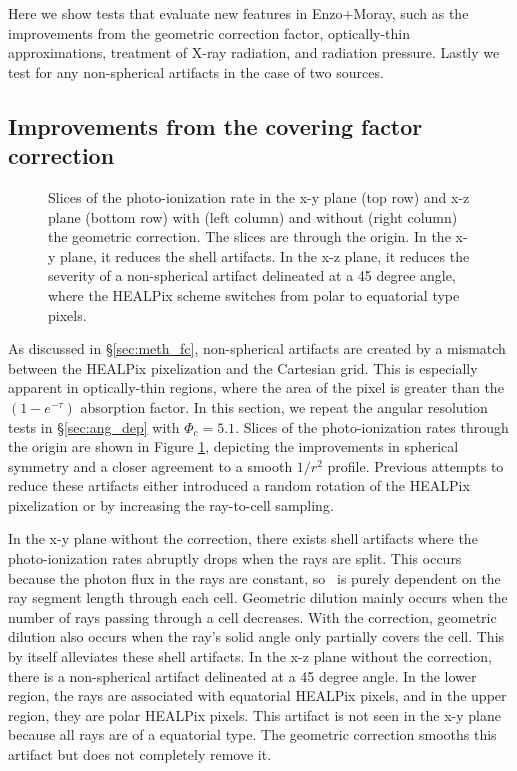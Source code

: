 \documentclass[useAMS,usenatbib,a4paper]{mn2e}
\begin{document}
Here we show tests that evaluate new features in Enzo+Moray, such as
the improvements from the geometric correction factor, optically-thin
approximations, treatment of X-ray radiation, and radiation pressure.
Lastly we test for any non-spherical artifacts in the case of two
sources.

\subsection{Improvements from the covering factor correction}
\label{sec:test_fc}

\begin{figure}
  \caption{\label{fig:fc_slices} Slices of the photo-ionization rate
    in the x-y plane (top row) and x-z plane (bottom row) with (left
    column) and without (right column) the geometric correction.  The
    slices are through the origin.  In the x-y plane, it reduces the
    shell artifacts.  In the x-z plane, it reduces the severity of a
    non-spherical artifact delineated at a 45 degree angle, where the
    HEALPix scheme switches from polar to equatorial type pixels.}
\end{figure}

As discussed in \S\ref{sec:meth_fc}, non-spherical artifacts are
created by a mismatch between the HEALPix pixelization and the
Cartesian grid.  This is especially apparent in optically-thin
regions, where the area of the pixel is greater than the
$(1-e^{-\tau})$ absorption factor.  In this section, we repeat the
angular resolution tests in \S\ref{sec:ang_dep} with $\Phi_c = 5.1$.
Slices of the photo-ionization rates through the origin are shown in
Figure \ref{fig:fc_slices}, depicting the improvements in spherical
symmetry and a closer agreement to a smooth $1/r^2$ profile.  Previous
attempts to reduce these artifacts either introduced a random rotation
of the HEALPix pixelization \citep[e.g.][]{Abel02_RT, Trac07,
  Krumholz07_ART} or by increasing the ray-to-cell sampling.

In the x-y plane without the correction, there exists shell artifacts
where the photo-ionization rates abruptly drops when the rays are
split.  This occurs because the photon flux in the rays are constant,
so \kph~is purely dependent on the ray segment length through each
cell.  Geometric dilution mainly occurs when the number of rays
passing through a cell decreases.  With the correction, geometric
dilution also occurs when the ray's solid angle only partially covers
the cell.  This by itself alleviates these shell artifacts.  In the
x-z plane without the correction, there is a non-spherical artifact
delineated at a 45 degree angle.  In the lower region, the rays are
associated with equatorial HEALPix pixels, and in the upper region,
they are polar HEALPix pixels.  This artifact is not seen in the x-y
plane because all rays are of a equatorial type.  The geometric
correction smooths this artifact but does not completely remove it.
\end{document}

